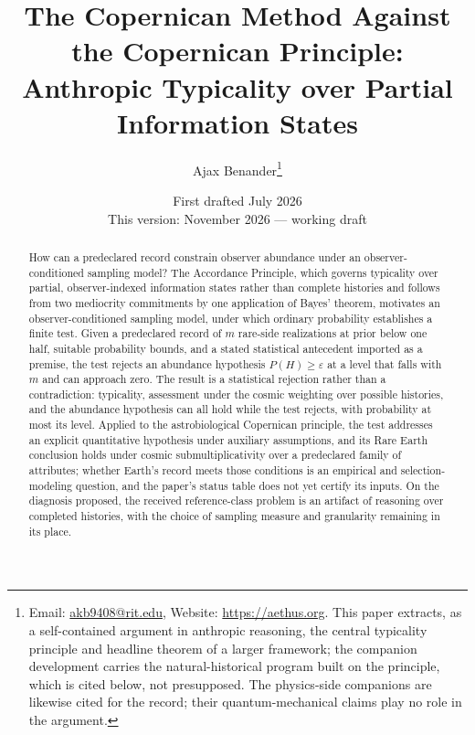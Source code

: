 \newtheorem{theorem}{Theorem}
\newtheorem{principle}{Principle}
\newtheorem{corollary}{Corollary}
\newtheorem{lemma}{Lemma}
\theoremstyle{definition}
\newtheorem{definition}{Definition}

\title{The Copernican Method Against the Copernican Principle:\\ Anthropic Typicality over Partial Information States}
\author{Ajax Benander\thanks{Email: \href{mailto:akb9408@rit.edu}{akb9408@rit.edu}, Website: \url{https://aethus.org}. This paper extracts, as a self-contained argument in anthropic reasoning, the central typicality principle and headline theorem of a larger framework; the companion development \cite{Nexus} carries the natural-historical program built on the principle, which is cited below, not presupposed. The physics-side companions \cite{AethusBrief, Aethus} are likewise cited for the record; their quantum-mechanical claims play no role in the argument.}}
\date{First drafted July 2026\\ {\small This version: November 2026 --- working draft}}
\usepackage{booktabs}
\usepackage{enumitem}


\maketitle

\begin{abstract}
How can a predeclared record constrain observer abundance under an observer-conditioned sampling model? The Accordance Principle, which governs typicality over partial, observer-indexed information states rather than complete histories and follows from two mediocrity commitments by one application of Bayes' theorem, motivates an observer-conditioned sampling model, under which ordinary probability establishes a finite test. Given a predeclared record of $m$ rare-side realizations at prior below one half, suitable probability bounds, and a stated statistical antecedent imported as a premise, the test rejects an abundance hypothesis $P(H) \ge \varepsilon$ at a level that falls with $m$ and can approach zero. The result is a statistical rejection rather than a contradiction: typicality, assessment under the cosmic weighting over possible histories, and the abundance hypothesis can all hold while the test rejects, with probability at most its level. Applied to the astrobiological Copernican principle, the test addresses an explicit quantitative hypothesis under auxiliary assumptions, and its Rare Earth conclusion holds under cosmic submultiplicativity over a predeclared family of attributes; whether Earth's record meets those conditions is an empirical and selection-modeling question, and the paper's status table does not yet certify its inputs. On the diagnosis proposed, the received reference-class problem is an artifact of reasoning over completed histories, with the choice of sampling measure and granularity remaining in its place.
\end{abstract}

